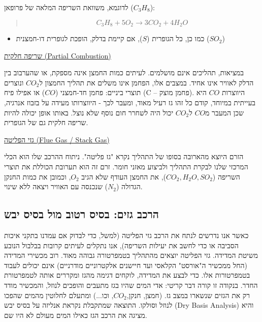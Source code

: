 \documentclass[
  hebrew,
  letterpaper,
  DIV=11,
  numbers=noendperiod]{scrreprt}
\providecommand{\tightlist}{%
  \setlength{\itemsep}{0pt}\setlength{\parskip}{0pt}}
\begin{document}
לדוגמא, משוואת השריפה המלאה של פרופאן (\(C_{3}H_{8}\)):

\begin{quote}
\[C_{3}H_{8} + 5O_{2} \rightarrow 3CO_{2} + 4H_{2}O\]
\end{quote}

\begin{itemize}
\tightlist
\item
  כמו כן, כל הגופרית (\(S\)), אם קיימת בדלק, הופכת לגופרית דו-חמצנית
  (\(SO_{2}\))
\end{itemize}

\ul{שריפה חלקית (Partial Combustion)}

במציאות, תהליכים אינם מושלמים. לעיתים כמות החמצן אינה מספקת, או שהערבוב
בין הדלק לאוויר אינו אחיד. במצבים אלו, הפחמן אינו משלים את תהליך החמצון
ל\(CO_{2}\) ונוצרים תוצרי ביניים: פחמן חד-חמצני (\(CO\)) או אפילו פיח (C
-- פחמן מוצק). היווצרות \(CO\) היא בעייתית במיוחד, קודם כל זהו גז רעיל
מאוד, ומעבר לכך - היווצרותו מעידה על בזבוז אנרגיה, שכן המעבר מ\(CO\)
ל\(CO_{2}\) יכול היה לשחרר חום נוסף שלא נוצל. באותו אופן יכולה להיות
שריפה חלקית גם של הגופרית.

\ul{גזי הפליטה (Flue Gas / Stack Gas)}

הזרם היוצא מהארובה בסופו של התהליך נקרא "גז פליטה". ניתוח ההרכב שלו הוא
הכלי המרכזי שלנו לבקרת התהליך ולביצוע מאזני חומר. זרם זה הוא תערובת
הכוללת את תוצרי השריפה (\(CO_{2},H_{2}O,SO_{2}\)), את החמצן העודף שלא
הגיב \(O_{2}\), וכמובן את כמות החנקן הגדולה (\(N_{2}\)) שנכנסה עם האוויר
ויצאה ללא שינוי.

\subsection{הרכב גזים: בסיס רטוב מול בסיס
יבש}\label{ux5d4ux5e8ux5dbux5d1-ux5d2ux5d6ux5d9ux5dd-ux5d1ux5e1ux5d9ux5e1-ux5e8ux5d8ux5d5ux5d1-ux5deux5d5ux5dc-ux5d1ux5e1ux5d9ux5e1-ux5d9ux5d1ux5e9}

כאשר אנו נדרשים לנתח את הרכב גזי הפליטה (למשל, כדי לבדוק אם עמדנו בתקני
איכות הסביבה או כדי לחשב את יעילות השריפה), אנו נתקלים לעיתים קרובות
בבלבול הנובע משיטת המדידה. גזי הפליטה יוצאים מהתהליך בטמפרטורה גבוהה
מאוד. רוב מכשירי המדידה (החל ממכשיר ה"אורסט" הקלאסי ועד חיישנים
אלקטרוניים מודרניים) אינם יכולים לעבוד בטמפרטורות אלו. כדי לבצע את
המדידה, לוקחים דגימה מהגז ומקררים אותה לטמפרטורת החדר. בנקודה זו קורה
דבר קריטי: אדי המים שהיו בגז מתעבים והופכים לנוזל, והמכשיר מודד רק את
הגזים שנשארו במצב גז. (חמצן, חנקן,\(CO_{2}\), וכו...) ומתעלם לחלוטין
מהמים שהפכו לנוזל וסולקו. התוצאה שמתקבלת נקראת אנליזה על בסיס יבש (Dry
Basis Analysis) והיא מציגה את הרכב הגז כאילו המים מעולם לא היו שם.
\end{document}
